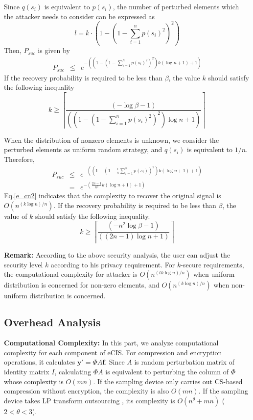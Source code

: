 \documentclass[conference]{IEEEtran}
\begin{document}
Since $q(s_i)$ is equivalent to $p(s_i)$,  the number of perturbed elements which the attacker needs to consider  can be expressed as
\begin{equation*}
   l= k\cdot(1-(1-\sum_{i=1}^n p(s_i)^2)^2)
\end{equation*}
Then,  $P_{suc}$ is given by
\begin{eqnarray}
    P_{suc} & \leq &  e^{-((1-(1-\sum_{i=1}^n p(s_i)^2)^2) k(\log n+1)+1)}
\end{eqnarray}
If the recovery probability is required to be less than $\beta$, the value $k$ should satisfy the following inequality
\begin{equation*}
    k\geq \left\lceil\frac{(-\log\beta-1)}{((1-(1-\sum_{i=1}^n p(s_i)^2)^2)\log n+1)} \right\rceil
\end{equation*}

When the distribution of nonzero elements is unknown, we consider the perturbed elements as uniform random strategy, and $q(s_i)$ is equivalent to  $1/n$. Therefore,
\begin{eqnarray}\label{e_cn2}
    P_{suc} & \leq &  e^{-((1-(1-\frac{1}{n}\sum_{i=1}^n p(s_i))^2) k(\log n+1)+1)} \nonumber \\
    & = & e^{-(\frac{2n-1}{n^2} k(\log n+1)+1)}
\end{eqnarray}
Eq.\ref{e_cn2} indicates  that the complexity to recover  the original signal is $O(n^{(k\log n)/n})$.
If the recovery probability is required to be less than $\beta$, the value of $k$ should satisfy the following inequality.
\begin{equation*}
    k\geq \left\lceil\frac{(-n^2\log\beta-1)}{((2n-1)\log n+1)} \right\rceil
\end{equation*}

\textbf{Remark:} According to the above security analysis, the user can adjust the security level $k$ according to his privacy requirement. For $k$-secure requirements, the computational complexity for attacker is $O(n^{(tk\log n)/n})$ when uniform distribution is concerned for non-zero elements, and $O(n^{(k\log n)/n})$ when non-uniform distribution is concerned.

\subsection{Overhead Analysis}
\textbf{Computational Complexity:}
In this part, we analyze computational complexity for each component of eCIS. For compression and encryption operations, it calculates $\mathbf{y}'=\Phi A\mathbf{f}$. Since $A$ is random perturbation matrix of identity matrix $I$, calculating $\Phi A$ is equivalent to perturbing the column of $\Phi$ whose  complexity is $O(mn)$. If the sampling device only carries out CS-based compression without encryption, the  complexity is also $O(mn)$. If the sampling device takes LP transform outsourcing \cite{wang2014privacy}, its complexity is $O(n^\theta+mn)$ ($2<\theta<3$).
\end{document}
